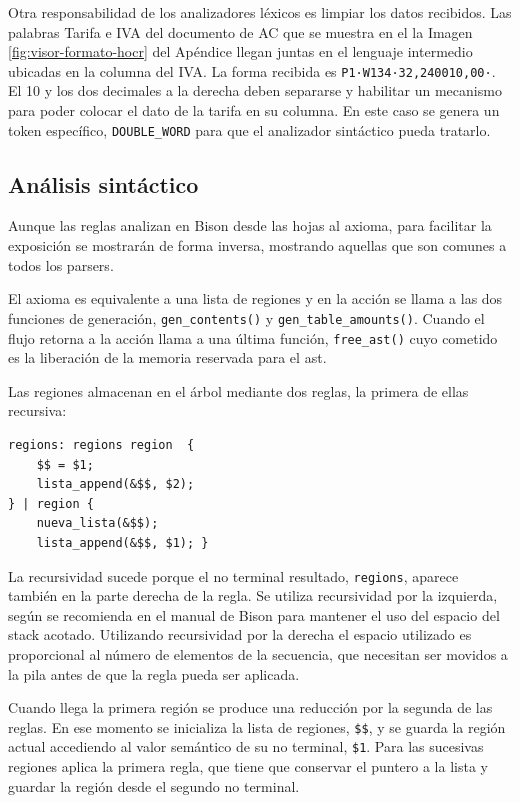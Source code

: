 Otra responsabilidad de los analizadores léxicos es limpiar los datos recibidos. Las palabras Tarifa e IVA del documento de AC que se muestra en el la Imagen \ref{fig:visor-formato-hocr} del Apéndice llegan juntas en el lenguaje intermedio ubicadas en la columna del IVA. La forma recibida es \verb|P1·W134·32,240010,00·|. El 10 y los dos decimales a la derecha deben separarse y habilitar un mecanismo para poder colocar el dato de la tarifa en su columna. En este caso se genera un token específico, \verb|DOUBLE_WORD| para que el analizador sintáctico pueda tratarlo.

\subsection{Análisis sintáctico}

Aunque las reglas analizan en Bison desde las hojas al axioma, para facilitar la exposición se mostrarán de forma inversa, mostrando aquellas que son comunes a todos los parsers.

El axioma es equivalente a una lista de regiones y en la acción se llama a las dos funciones de generación, \verb|gen_contents()| y \verb|gen_table_amounts()|. Cuando el flujo retorna a la acción llama a una última función, \verb|free_ast()| cuyo cometido es la liberación de la memoria reservada para el \acrshort{ast}.

Las regiones almacenan en el árbol mediante dos reglas, la primera de ellas recursiva:

\begin{lstlisting}[caption={},label={}]
regions: regions region  {
    $$ = $1;
    lista_append(&$$, $2);
} | region {
    nueva_lista(&$$);
    lista_append(&$$, $1); }
\end{lstlisting}

La recursividad sucede porque el no terminal resultado, \verb|regions|, aparece también en la parte derecha de la regla. Se utiliza recursividad por la izquierda, según se recomienda en el manual de Bison para mantener el uso del espacio del stack acotado. Utilizando recursividad por la derecha el espacio utilizado es proporcional al número de elementos de la secuencia, que necesitan ser movidos a la pila antes de que la regla pueda ser aplicada.

Cuando llega la primera región se produce una reducción por la segunda de las reglas. En ese momento se inicializa la lista de regiones, \verb|$$|, y se  guarda la región actual accediendo al valor semántico de su no terminal, \verb|$1|. Para las sucesivas regiones aplica la primera regla, que tiene que conservar el puntero a la lista y guardar la región desde el segundo no terminal.


